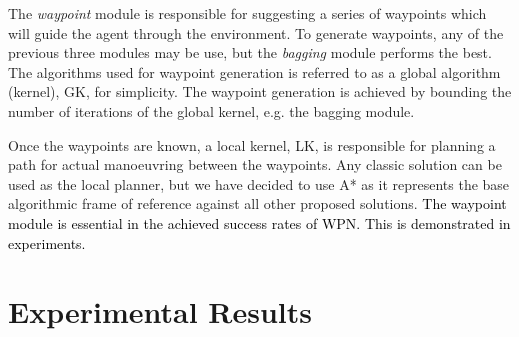 \documentclass[journal, twocolumn]{IEEEtran}
\begin{document}
The \emph{waypoint} module is responsible for suggesting a series of waypoints which will guide the agent through the environment. To generate waypoints, any of the previous three modules may be use, but the \emph{bagging} module performs the best. The algorithms used for waypoint generation is referred to as a global algorithm (kernel), GK, for simplicity. The waypoint generation is achieved by bounding the number of iterations of the global kernel, e.g. the bagging module.

Once the waypoints are known, a local kernel, LK, is responsible for planning a path for actual manoeuvring between the waypoints. Any classic solution can be used as the local planner, but we have decided to use A* as it represents the base algorithmic frame of reference against all other proposed solutions. \textcolor{black}{The waypoint module is essential in the achieved success rates of WPN. This is demonstrated in experiments.}


\section{Experimental Results}
\label{sec:result}
\end{document}
